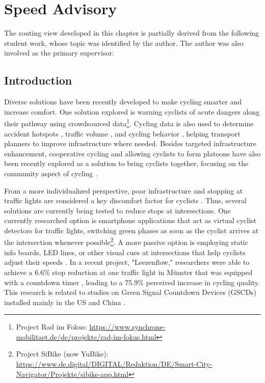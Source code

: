 \chapter{Speed Advisory}\label{ch:app}

\begin{Summary}
The routing view developed in this chapter is partially derived from the following student work, whose topic was identified by the author. The author was also involved as the primary supervisor:

\cite{pickhardt_2022} 
\end{Summary}

\section{Introduction}

Diverse solutions have been recently developed to make cycling smarter and increase comfort. One solution explored is warning cyclists of acute dangers along their pathway using crowdsourced data\footnote{Project Rad im Fokus: \url{https://www.synchrone-mobilitaet.de/de/projekte/rad-im-fokus.html}}. Cycling data is also used to determine accident hotspots \cite{von_stulpnagel_crash_2022}, traffic volume \cite{lissner_modeling_2018}, and cycling behavior \cite{lisner_gps-data_2020}, helping transport planners to improve infrastructure where needed. Besides targeted infrastructure enhancement, cooperative cycling and allowing cyclists to form platoons have also been recently explored as a solution to bring cyclists together, focusing on the community aspect of cycling \cite{cespedes_group_2019, meng_connected_2022}.

From a more individualized perspective, poor infrastructure and stopping at traffic lights are considered a key discomfort factor for cyclists \cite{otto_framework_2023}. Thus, several solutions are currently being tested to reduce stops at intersections. One currently researched option is smartphone applications that act as virtual cyclist detectors for traffic lights, switching green phases as soon as the cyclist arrives at the intersection whenever possible\footnote{Project SiBike (now YuBike): \url{https://www.de.digital/DIGITAL/Redaktion/DE/Smart-City-Navigator/Projekte/sibike-app.html}}. A more passive option is employing static info boards, LED lines, or other visual cues at intersections that help cyclists adjust their speeds \cite{de_angelis_green_2019}. In a recent project, "Leezenflow," researchers were able to achieve a 6.6\% stop reduction at one traffic light in Münster that was equipped with a countdown timer \cite{brand_riding_2024}, leading to a 75.9\% perceived increase in cycling quality. This research is related to studies on Green Signal Countdown Devices (GSCDs) installed mainly in the US and China \cite{lum_before-and-after_2006, huang_evaluating_2014, ni_estimating_2014, chen_exploring_2015, islam_improved_2016}. 

